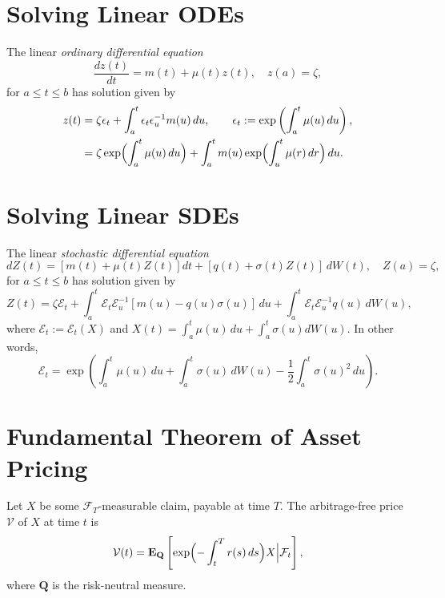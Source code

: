 \documentclass[twocolumn]{amsart}
\newcommand{\Q}{\mathbf{Q}}
\newcommand{\EQ}{\mathbf{E}_\mathbf{Q}}
\newcommand{\F}{\mathcal{F}}
\newcommand{\sE}{\mathcal{E}}
\begin{document}
\section*{Solving Linear ODEs}

The linear \emph{ordinary differential equation}
\begin{equation*}
    \frac{dz(t)}{dt} = m(t) + \mu(t)z(t), \quad z(a) = \zeta,
\end{equation*}
for $a \le t \le b$ has solution given by
\begin{equation*}
    \begin{aligned}
    z(t) &= \zeta \epsilon_t + \int_a^t \epsilon_t \epsilon_u^{-1} m(u)\,du, \qquad\epsilon_t := \exp\left(\int_a^t \mu(u)\,du\right), \\
    & = \zeta \exp\Bigl({\int_a^t \mu(u)\,du}\Bigr) + \int_a^t m(u) \exp\Bigl({\int_u^t \mu(r)\,dr}\Bigr)\,du.
    \end{aligned}
\end{equation*}

\section*{Solving Linear SDEs}

The linear \emph{stochastic differential equation}
\begin{equation*}
    dZ(t) = [m(t)+\mu(t)Z(t)]dt + [q(t)+\sigma(t)Z(t)]\,dW(t), \quad Z(a) = \zeta,
\end{equation*}
for $a \le t \le b$ has solution given by
\begin{equation*}
    Z(t) = \zeta \sE_t + \int_a^t \sE_t \sE_u^{-1}[m(u)-q(u)\sigma(u)]\,du + \int_a^t \sE_t \sE_u^{-1} q(u)\,dW(u),
\end{equation*}
where $\sE_t := \sE_t(X)$ and $X(t) = \int_a^t\mu(u)\,du + \int_a^t\sigma(u)dW(u)$. In other words,
\begin{equation*}
    \sE_t = \exp\left(\int_a^t\mu(u)\,du + \int_a^t\sigma(u)\,dW(u) - \frac{1}{2} \int_a^t \sigma(u)^2\,du\right).
\end{equation*}


\section*{Fundamental Theorem of Asset Pricing}

Let $X$ be some $\F_T$-measurable claim, payable at time $T$. The arbitrage-free price $\mathcal{V}$ of $X$ at time $t$ is
\begin{equation*}
    \mathcal{V}(t) = \EQ\left[\exp\Bigl(-\int_t^T r(s)\,ds\Bigr) X \Bigl| \F_t \Bigr.\right],
\end{equation*}
where $\Q$ is the risk-neutral measure.
\end{document}
